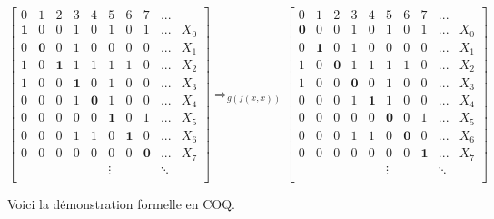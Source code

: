 \documentclass[11pt]{book}
\begin{document}
\[
\begin{bmatrix}
 0 & 1 & 2 & 3 & 4 & 5 & 6 & 7 &  ... &     \\ 
 \mathbf{1} & 0 & 0 & 1 & 0 & 1 & 0 & 1 &  ... &   X_0 \\
 0 & \mathbf{0} & 0 & 1 & 0 & 0 & 0 & 0 &  ... &   X_1 \\
 1 & 0 & \mathbf{1} & 1 & 1 & 1 & 1 & 0 &  ... &   X_2 \\
 1 & 0 & 0 & \mathbf{1} & 0 & 1 & 0 & 0 &  ... &   X_3 \\
 0 & 0 & 0 & 1 & \mathbf{0} & 1 & 0 & 0 &  ... &   X_4 \\
 0 & 0 & 0 & 0 & 0 & \mathbf{1} & 0 & 1 &  ... &   X_5 \\
 0 & 0 & 0 & 1 & 1 & 0 & \mathbf{1} & 0 &  ... &   X_6 \\
 0 & 0 & 0 & 0 & 0 & 0 & 0 & \mathbf{0} &  ... &   X_7 \\
   &   &   &   &   & \vdots &  &  &\ddots  \\
\end{bmatrix}
\Rightarrow_{g(f(x,x))}
\begin{bmatrix}
 0 & 1 & 2 & 3 & 4 & 5 & 6 & 7 &  ... &     \\ 
 \mathbf{0} & 0 & 0 & 1 & 0 & 1 & 0 & 1 &  ... &   X_0 \\
 0 & \mathbf{1} & 0 & 1 & 0 & 0 & 0 & 0 &  ... &   X_1 \\
 1 & 0 & \mathbf{0} & 1 & 1 & 1 & 1 & 0 &  ... &   X_2 \\
 1 & 0 & 0 & \mathbf{0} & 0 & 1 & 0 & 0 &  ... &   X_3 \\
 0 & 0 & 0 & 1 & \mathbf{1} & 1 & 0 & 0 &  ... &   X_4 \\
 0 & 0 & 0 & 0 & 0 & \mathbf{0} & 0 & 1 &  ... &   X_5 \\
 0 & 0 & 0 & 1 & 1 & 0 & \mathbf{0} & 0 &  ... &   X_6 \\
 0 & 0 & 0 & 0 & 0 & 0 & 0 & \mathbf{1} &  ... &   X_7 \\
   &   &   &   &   & \vdots &  &  &\ddots  \\
\end{bmatrix}
\]


\vspace{0.5cm}

Voici la démonstration formelle en COQ.
\\
\end{document}
